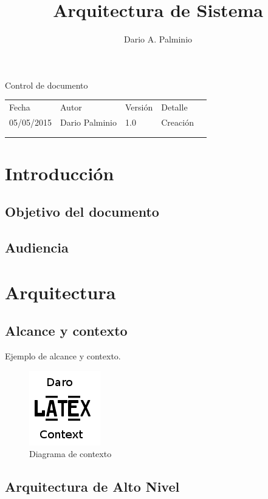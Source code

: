 \documentclass[a4paper,11pt]{book}
\title{Arquitectura de Sistema}
\author{Dario A. Palminio}
\begin{document}
\maketitle

Control de documento

\begin{table}[h]
\begin{tabular}{lllll}
\cline{1-4}
\multicolumn{1}{|l|}{Fecha}       & \multicolumn{1}{l|}{Autor}         & \multicolumn{1}{l|}{Versión} & \multicolumn{1}{l|}{Detalle}   &  \\ \cline{1-4}
\multicolumn{1}{|l|}{05/05/2015} & \multicolumn{1}{l|}{Dario Palminio} & \multicolumn{1}{l|}{1.0}     & \multicolumn{1}{l|}{Creación} &  \\ \cline{1-4}
                                 &                                     &                              &                               &  \\
                                 &                                     &                              &                               & 
\end{tabular}
\end{table}

\tableofcontents

\chapter{Introducción}

\section{Objetivo del documento}

\section{Audiencia}

\chapter{Arquitectura}

\section{Alcance y contexto}

Ejemplo de alcance y contexto.

\begin{figure}[h] %
  \includegraphics{image_001}
  \caption{Diagrama de contexto}
  \centering
  \label{fig:context} %
\end{figure}

\section{Arquitectura de Alto Nivel}
\end{document}
